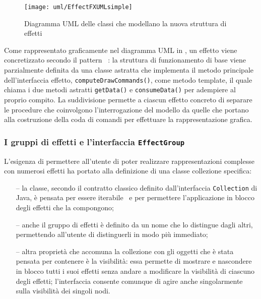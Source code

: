                 \begin{figure}[htbp]
                    \centering
                    \texttt{[image: uml/EffectFXUMLsimple]}
                    \caption{%
                        Diagramma UML delle classi che modellano la nuova struttura di effetti%
                    }
                    \label{fig:effectFX}
                \end{figure}

                Come rappresentato graficamente nel diagramma UML in , un effetto viene concretizzato secondo il pattern ~\cite{templateMethod}:
                la struttura di funzionamento di base viene parzialmente definita da una classe astratta che implementa il metodo principale dell'interfaccia effetto, \texttt{computeDrawCommands()}, come metodo template, il quale chiama i due metodi astratti \texttt{getData()} e \texttt{consumeData()} per adempiere al proprio compito.
                La suddivisione permette a ciascun effetto concreto di separare le procedure che coinvolgono l'interrogazione del modello da quelle che portano alla costruzione della coda di comandi per effettuare la rappresentazione grafica.

            \subsubsection{I gruppi di effetti e l'interfaccia \texttt{EffectGroup}}\label{subsubsec:effectGroup}
                L'esigenza di permettere all'utente di poter realizzare rappresentazioni complesse con numerosi effetti ha portato alla definizione di una classe collezione specifica:
                \begin{itemize}
                    \item[--]\label{itm:eFXgIterator}
                        la classe, secondo il contratto classico definito dall'interfaccia \texttt{Collection} di Java, è pensata per essere iterabile~\cite{iterator} e per permettere l'applicazione in blocco degli effetti che la compongono;

                    \item[--]\label{itm:eFXgName}
                        anche il gruppo di effetti è definito da un nome che lo distingue dagli altri, permettendo all'utente di distinguerli in modo più immediato;

                    \item[--]\label{itm:eFXgVis}
                        altra proprietà che accomuna la collezione con gli oggetti che è stata pensata per contenere è la visibilità:
                        essa permette di mostrare e nascondere in blocco tutti i suoi effetti senza andare a modificare la visibilità di ciascuno degli effetti;
                        l'interfaccia consente comunque di agire anche singolarmente sulla visibilità dei singoli nodi.
                \end{itemize}

